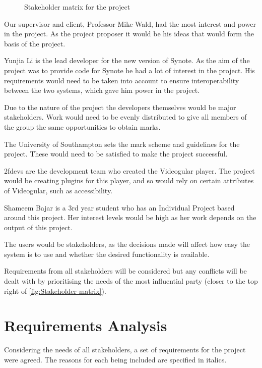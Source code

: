 \begin{figure}[h!]
	\centering
	
	\caption{Stakeholder matrix for the project\label{fig:Stakeholder matrix}}
\end{figure}

Our supervisor and client, Professor Mike Wald, had the most interest and power in the project. As the project proposer it would be his ideas that would form the basis of the project.

Yunjia Li is the lead developer for the new version of Synote. As the aim of the project was to provide code for Synote he had a lot of interest in the project. His requirements would need to be taken into account to ensure interoperability between the two systems, which gave him power in the project.

Due to the nature of the project the developers themselves would be major stakeholders. Work would need to be evenly distributed to give all members of the group the same opportunities to obtain marks.

The University of Southampton sets the mark scheme and guidelines for the project. These would need to be satisfied to make the project successful.

2fdevs are the development team who created the \gls{Videogular} player. The project would be creating plugins for this player, and so would rely on certain attributes of \gls{Videogular}, such as accessibility.

Shameem Bajar is a 3rd year student who has an Individual Project based around this project. Her interest levels would be high as her work depends on the output of this project.

The users would be stakeholders, as the decisions made will affect how easy the system is to use and whether the desired functionality is available.

Requirements from all stakeholders will be considered but any conflicts will be dealt with by prioritising the needs of the most influential party (closer to the top right of \autoref{fig:Stakeholder matrix}).

\section{Requirements Analysis}
\label{Section:Requirements Analysis}
Considering the needs of all stakeholders, a set of requirements for the project were agreed. The reasons for each being included are specified in italics.


